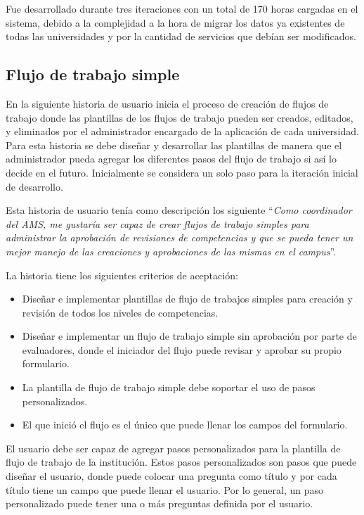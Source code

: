 Fue desarrollado durante tres iteraciones con un total de 170 horas cargadas en el sistema, debido a la complejidad a la hora de migrar los datos ya existentes de todas las universidades y por la cantidad de servicios que debían ser modificados.

\subsection{Flujo de trabajo simple}
En la siguiente historia de usuario inicia el proceso de creación de flujos de trabajo donde las plantillas de los flujos de trabajo pueden ser creados, editados, y eliminados por el administrador encargado de la aplicación de cada universidad. Para esta historia se debe diseñar y desarrollar las plantillas de manera que el administrador pueda agregar los diferentes pasos del flujo de trabajo si así lo decide en el futuro. Inicialmente se considera un solo paso para la iteración inicial de desarrollo.

Esta historia de usuario tenía como descripción los siguiente \enquote{\textit{Como coordinador del AMS, me gustaría ser capaz de crear flujos de trabajo simples para administrar la aprobación de revisiones de competencias y que se pueda tener un mejor manejo de las creaciones y aprobaciones de las mismas en el campus}}.

La historia tiene los siguientes criterios de aceptación:
\begin{itemize}
	\item Diseñar e implementar plantillas de flujo de trabajos simples para creación y revisión de todos los niveles de competencias.
	\item Diseñar e implementar un flujo de trabajo simple sin aprobación por parte de evaluadores, donde el iniciador del flujo puede revisar y aprobar su propio formulario.
	\item La plantilla de flujo de trabajo simple debe soportar el uso de pasos personalizados.
	\item El que inició el flujo es el único que puede llenar los campos del formulario.
\end{itemize}

El usuario debe ser capaz de agregar pasos personalizados para la plantilla de flujo de trabajo de la institución. Estos pasos personalizados son pasos que puede diseñar el usuario, donde puede colocar una pregunta como título y por cada título tiene un campo que puede llenar el usuario. Por lo general, un paso personalizado puede tener una o más preguntas definida por el usuario.

